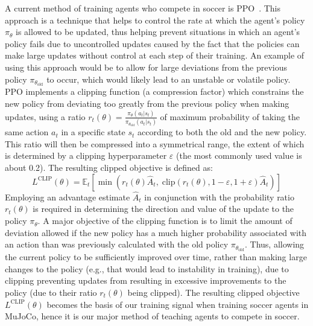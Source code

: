 A current method of training agents who compete in soccer is PPO~\citep{schulman2017proximal}. This approach is a technique that helps to control the rate at which the agent's policy $\pi_\theta$ is allowed to be updated, thus helping prevent situations in which an agent's policy fails due to uncontrolled updates caused by the fact that the policies can make large updates without control at each step of their training. An example of using this approach would be to allow for large deviations from the previous policy $\pi_{\theta_{\text{old}}}$ to occur, which would likely lead to an unstable or volatile policy. PPO implements a clipping function (a compression factor) which constrains the new policy from deviating too greatly from the previous policy when making updates, using a ratio $r_t(\theta) = \frac{\pi_\theta(a_t|s_t)}{\pi_{\theta_{\text{old}}}(a_t|s_t)}$ of maximum probability of taking the same action $a_t$ in a specific state $s_t$ according to both the old and the new policy. This ratio will then be compressed into a symmetrical range, the extent of which is determined by a clipping hyperparameter $\varepsilon$ (the most commonly used value is about 0.2). The resulting clipped objective is defined as:
\begin{equation}
    L^{\text{CLIP}}(\theta) = \mathbb{E}_t \left[ \min \left( r_t(\theta) \hat{A}_t, \; \text{clip}(r_t(\theta), 1 - \varepsilon, 1 + \varepsilon) \hat{A}_t \right) \right]
\end{equation}
Employing an advantage estimate $\hat{A}_t$ in conjunction with the probability ratio $r_t(\theta)$ is required in determining the direction and value of the update to the policy $\pi_\theta$. A major objective of the clipping function is to limit the amount of deviation allowed if the new policy has a much higher probability associated with an action than was previously calculated with the old policy $\pi_{\theta_{\text{old}}}$. Thus, allowing the current policy to be sufficiently improved over time, rather than making large changes to the policy (e.g., that would lead to instability in training), due to clipping preventing updates from resulting in excessive improvements to the policy (due to their ratio $r_t(\theta)$ being clipped). The resulting clipped objective $L^{\text{CLIP}}(\theta)$ becomes the basis of our training signal when training soccer agents in MuJoCo, hence it is our major method of teaching agents to compete in soccer.

